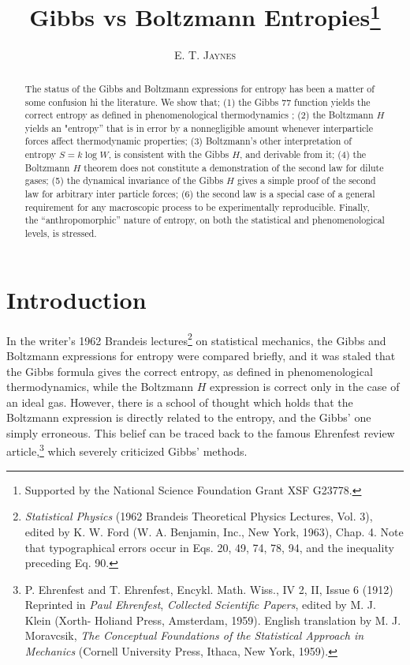 \documentclass[twocolumn]{article}
\title{Gibbs vs Boltzmann Entropies\footnote{Supported by the National
  Science Foundation Grant XSF G23778.}}
\author{E. T. J\textsc{aynes}}
\date{}
\begin{document}
\maketitle


\begin{abstract}
The status of the Gibbs and Boltzmann expressions for entropy has been
a matter of some confusion hi the literature. We show that; (1) the
Gibbs 77 function yields the correct entropy as defined in
phenomenological thermodynamics ; (2) the Boltzmann $H$ yields an
"entropy'' that is in error by a nonnegligible amount whenever
interparticle forces affect thermodynamic properties; (3) Boltzmann's
other interpretation of entropy $S = k\log W$, is consistent with
the Gibbs $H$, and derivable from it; (4) the Boltzmann $H$
theorem does not constitute a demonstration of the second law for dilute
gases; (5) the dynamical invariance of the Gibbs $H$ gives a simple
proof of the second law for arbitrary inter particle forces; (6) the
second law is a special case of a general requirement for any
macroscopic process to be experimentally reproducible. Finally, the
``anthropomorphic'' nature of entropy, on both the statistical and
phenomenological levels, is stressed.
\end{abstract}

\section{Introduction}\label{sec-introduction}

In the writer's 1962 Brandeis lectures\footnote{\emph{Statistical
  Physics} (1962 Brandeis Theoretical Physics Lectures, Vol. 3), edited
  by K. W. Ford (W. A. Benjamin, Inc., New York, 1963), Chap. 4. Note
  that typographical errors occur in Eqs. 20, 49, 74, 78, 94, and the
  inequality preceding Eq. 90.} on statistical mechanics, the Gibbs and
Boltzmann expressions for entropy were compared briefly, and it was
staled that the Gibbs formula gives the correct entropy, as defined in
phenomenological thermodynamics, while the Boltzmann $H$ expression
is correct only in the case of an ideal gas. However, there is a school
of thought which holds that the Boltzmann expression is directly related
to the entropy, and the Gibbs' one simply erroneous. This belief can be
traced back to the famous Ehrenfest review article,\footnote{P.
  Ehrenfest and T. Ehrenfest, Encykl. Math. Wiss., IV 2, II, Issue 6
  (1912) Reprinted in \emph{Paul Ehrenfest}, \emph{Collected Scientific
  Papers}, edited by M. J. Klein (Xorth- Holiand Press, Amsterdam,
  1959). English translation by M. J. Moravcsik, \emph{The Conceptual
  Foundations of the Statistical Approach in Mechanics} (Cornell
  University Press, Ithaca, New York, 1959).} which severely criticized
Gibbs' methods.
\end{document}
